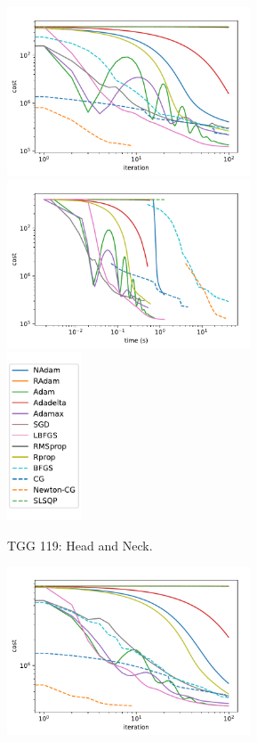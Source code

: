 \begin{figure}
\begin{subfigure}{\textwidth}
	\end{subfigure}
	\begin{subfigure}{\textwidth}
		\centering
		\includegraphics[height=5cm]{optimizers_comparison/TGG119HN-iter.pdf}
		\includegraphics[height=5cm]{optimizers_comparison/TGG119HN-time.pdf}
		\includegraphics[height=5cm]{optimizers_comparison/legend.pdf}
		\caption{TGG 119: Head and Neck.}
		\label{fig:TGG119_HN}
	\end{subfigure}
	\begin{subfigure}{\textwidth}
		\centering
		\includegraphics[height=5cm]{optimizers_comparison/TGG119Prostate-iter.pdf}

\end{subfigure}
\end{figure}
